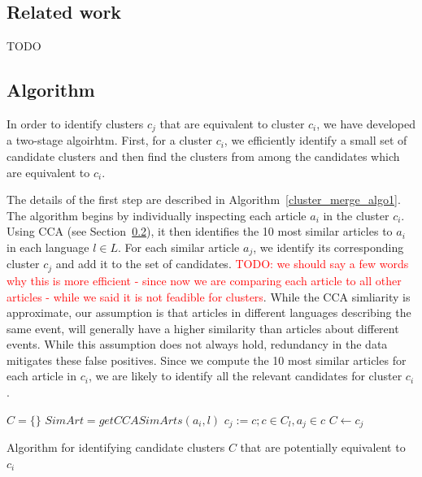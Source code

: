 \documentclass[twoside,11pt]{article}
\newcommand{\todo}[1]{\textcolor{red}{TODO: #1}}
\begin{document}
\subsection{Related work}

TODO

\subsection{Algorithm}

In order to identify clusters $c_j$ that are equivalent to cluster $c_i$, we have developed a two-stage algoirhtm. First, for a cluster $c_i$, we efficiently identify a small set of candidate clusters and then  find the clusters from among the candidates which are equivalent to $c_i$.

The details of the first step are described in Algorithm~\ref{cluster_merge_algo1}. The algorithm begins by individually inspecting each article $a_i$ in the cluster $c_i$. Using CCA  (see Section~\ref{}),  it then identifies the 10 most similar articles to $a_i$ in each language $l \in L$. For each  similar article $a_j$, we identify its corresponding  cluster $c_j$ and add it to the set of candidates. \todo{we should say a few words why this is more efficient - since now we are comparing each article to all other articles - while we said it is not feadible for clusters}. While the CCA simliarity is approximate, our  assumption  is that articles in different languages describing the same event, will generally have a higher similarity than articles about different events. While this assumption does not always hold, redundancy in the data mitigates these false positives. Since we compute the 10 most similar articles for each article in $c_i$, we are likely to identify all the relevant candidates for cluster $c_i$.

\begin{algorithm}[t!]
$C = \{\}$\;
 {
     {
        $SimArt = getCCASimArts(a_i, l)$\;
         {
            $c_j := c ; c \in C_l, a_j \in c$\;
            $C \leftarrow c_j$\;
        }
    }
}
\caption{Algorithm for identifying candidate clusters $C$ that are potentially equivalent to $c_i$}
\label{cluster_merge_algo1}
\end{algorithm}
\end{document}
